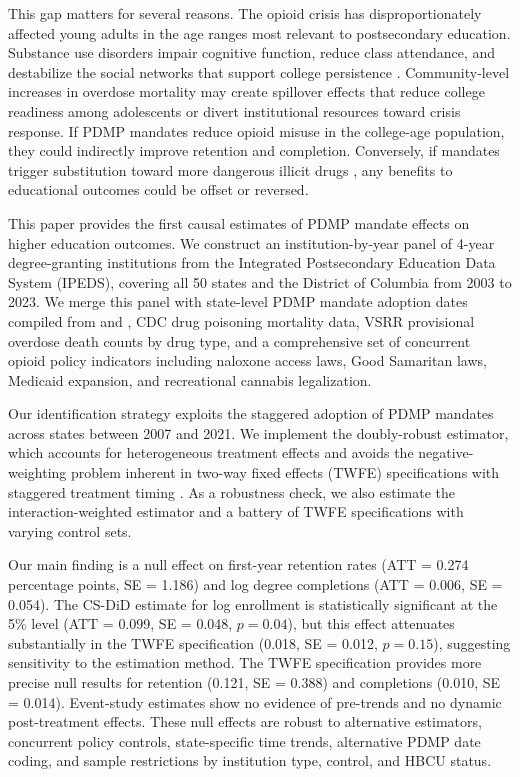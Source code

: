 \documentclass[12pt]{article}
\begin{document}
This gap matters for several reasons. The opioid crisis has disproportionately affected young adults in the age ranges most relevant to postsecondary education. Substance use disorders impair cognitive function, reduce class attendance, and destabilize the social networks that support college persistence \citep{carpenter2012economic}. Community-level increases in overdose mortality may create spillover effects that reduce college readiness among adolescents or divert institutional resources toward crisis response. If PDMP mandates reduce opioid misuse in the college-age population, they could indirectly improve retention and completion. Conversely, if mandates trigger substitution toward more dangerous illicit drugs \citep{alpert2018supply, evans2019opioid}, any benefits to educational outcomes could be offset or reversed.

This paper provides the first causal estimates of PDMP mandate effects on higher education outcomes. We construct an institution-by-year panel of 4-year degree-granting institutions from the Integrated Postsecondary Education Data System (IPEDS), covering all 50 states and the District of Columbia from 2003 to 2023. We merge this panel with state-level PDMP mandate adoption dates compiled from \citet{gunadi2023effect} and \citet{buchmueller2018effect}, CDC drug poisoning mortality data, VSRR provisional overdose death counts by drug type, and a comprehensive set of concurrent opioid policy indicators including naloxone access laws, Good Samaritan laws, Medicaid expansion, and recreational cannabis legalization.

Our identification strategy exploits the staggered adoption of PDMP mandates across states between 2007 and 2021. We implement the \citet{callaway2021difference} doubly-robust estimator, which accounts for heterogeneous treatment effects and avoids the negative-weighting problem inherent in two-way fixed effects (TWFE) specifications with staggered treatment timing \citep{goodman2017difference}. As a robustness check, we also estimate the \citet{sun2021estimating} interaction-weighted estimator and a battery of TWFE specifications with varying control sets.

Our main finding is a null effect on first-year retention rates (ATT = 0.274 percentage points, SE = 1.186) and log degree completions (ATT = 0.006, SE = 0.054). The CS-DiD estimate for log enrollment is statistically significant at the 5\% level (ATT = 0.099, SE = 0.048, $p = 0.04$), but this effect attenuates substantially in the TWFE specification (0.018, SE = 0.012, $p = 0.15$), suggesting sensitivity to the estimation method. The TWFE specification provides more precise null results for retention (0.121, SE = 0.388) and completions (0.010, SE = 0.014). Event-study estimates show no evidence of pre-trends and no dynamic post-treatment effects. These null effects are robust to alternative estimators, concurrent policy controls, state-specific time trends, alternative PDMP date coding, and sample restrictions by institution type, control, and HBCU status.
\end{document}
